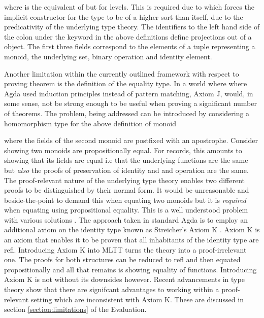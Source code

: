 where  is the equivalent of  but for
levels. This is required due to \AgdaField{$\bullet$} which
forces the implicit constructor for the type to be of a higher sort than
 itself, due to the predicativity of the underlying type theory.
The identifiers to the left hand side of the colon under the 
keyword in the above definitions define projections out of a
 object. The first three fields correspond to the elements
of a tuple representing a monoid, the underlying set, binary operation and
identity element.

Another limitation within the currently outlined framework with respect to
proving theorem is the definition of the equality type. In a world where where
Agda used induction principles instead of pattern matching, \textsf{Axiom J},
would, in some sense, not be strong enough to be useful when proving a
significant number of theorems. The problem, being addressed can be introduced
by considering a homomorphism type for the above definition of monoid

\begin{AgdaMultiCode}
\end{AgdaMultiCode}

where the fields of the second monoid are postfixed with an apostrophe. Consider
showing two monoids are propositionally equal. For records, this amounts to
showing that its fields are equal i.e that the underlying functions are the
same but \textit{also} the proofs of preservation of identity and and operation
are the same. The proof-relevant nature of the underlying type theory enables
two different proofs to be distinguished by their normal form. It would be
unreasonable and beside-the-point to demand this when equating two monoids but
it is \textit{required} when equating using propositional equality. This is a
well understood problem with various solutions . The
approach taken in standard Agda is to employ an additional axiom on the identity
type known as Streicher's \textsf{Axiom K} \cite{streicher1993investigations}.
\textsf{Axiom K} is an axiom that enables it to be proven that all inhabitants
of the identity type are \textsf{refl}. Introducing \textsf{Axiom K} into MLTT
turns the theory into a proof-irrelevant one. The proofs for both structures
can be reduced to refl and then equated propositionally and all that remains is
showing equality of functions. Introducing \textsf{Axiom K} is not without its
downsides however. Recent advancements in type theory \cite{hottbook}
show that there are signifcant advantages to working within a proof-relevant
setting which are inconsistent with \textsf{Axiom K}. These are discussed in
section \ref{section:limitations} of the Evaluation.

